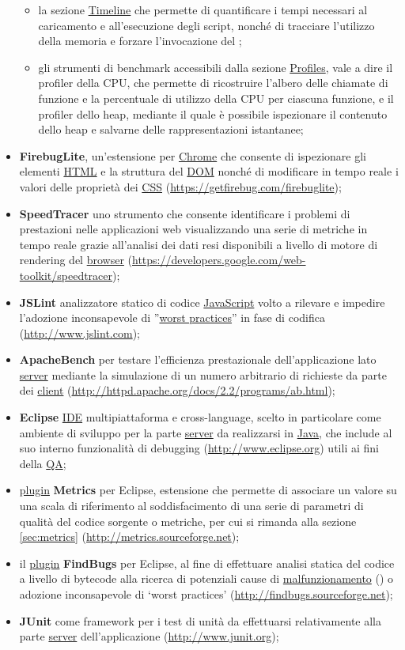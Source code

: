 \begin{itemize}
\begin{itemize}
   \item la sezione \underline{Timeline} che permette di quantificare i tempi necessari al caricamento e all'esecuzione degli script, nonché di tracciare l'utilizzo della memoria e forzare l'invocazione del ;
   \item  gli strumenti di benchmark accessibili dalla sezione \underline{Profiles}, vale a dire il profiler della CPU, che permette di ricostruire l'albero delle chiamate di funzione e la percentuale di utilizzo della CPU per ciascuna funzione, e il profiler dello heap, mediante il quale è possibile ispezionare il contenuto dello heap e salvarne delle rappresentazioni istantanee;
   \end{itemize}
  \item \textbf{FirebugLite}, un'estensione per \underline{Chrome} che consente di ispezionare gli elementi \underline{HTML} e la struttura del \underline{DOM} nonché di modificare in tempo reale i valori delle proprietà dei \underline{CSS} (\url{https://getfirebug.com/firebuglite});
  \item \textbf{SpeedTracer} uno strumento che consente identificare i problemi di prestazioni nelle applicazioni web visualizzando una serie di metriche in tempo reale grazie all'analisi dei dati resi disponibili a livello di motore di rendering del \underline{browser} (\url{https://developers.google.com/web-toolkit/speedtracer});
  \item \textbf{JSLint} analizzatore statico di codice \underline{JavaScript} volto a rilevare e impedire l'adozione inconsapevole di ''\underline{worst practices}'' in fase di codifica (\url{http://www.jslint.com});
  \item \textbf{ApacheBench} per testare l'efficienza prestazionale dell'applicazione lato \underline{server} mediante la simulazione di un numero arbitrario di richieste da parte dei \underline{client} (\url{http://httpd.apache.org/docs/2.2/programs/ab.html});
  \item \textbf{Eclipse} \underline{IDE} multipiattaforma e cross-language, scelto in particolare come ambiente di sviluppo per la parte \underline{server} da realizzarsi in \underline{Java}, che include al suo interno funzionalità di debugging (\url{http://www.eclipse.org}) utili ai fini della \underline{QA};
  \item \underline{plugin} \textbf{Metrics} per Eclipse, estensione che permette di associare un valore su una scala di riferimento al soddisfacimento di una serie di parametri di qualità del codice sorgente o metriche, per cui si rimanda alla sezione \ref{sec:metrics} (\url{http://metrics.sourceforge.net});
  \item il \underline{plugin} \textbf{FindBugs} per Eclipse, al fine di effettuare analisi statica del codice a livello di bytecode alla ricerca di potenziali cause di \underline{malfunzionamento} () o adozione inconsapevole di `worst practices' (\url{http://findbugs.sourceforge.net});
  \item \textbf{JUnit} come framework per i test di unità da effettuarsi relativamente alla parte \underline{server} dell'applicazione (\url{http://www.junit.org});
\end{itemize}

